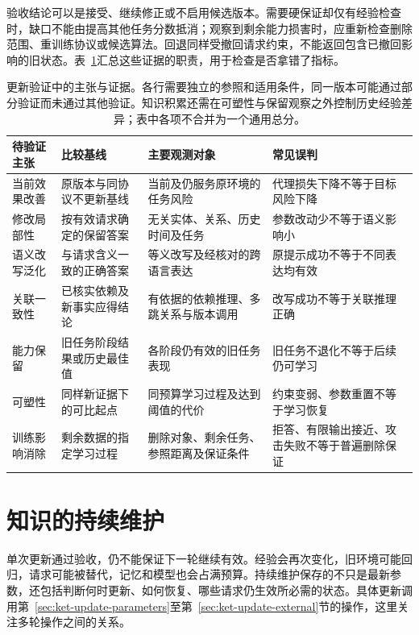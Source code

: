 验收结论可以是接受、继续修正或不启用候选版本。需要硬保证却仅有经验检查时，缺口不能由提高其他任务分数抵消；观察到剩余能力损害时，应重新检查删除范围、重训练协议或候选算法。回退同样受撤回请求约束，不能返回包含已撤回影响的旧状态。表~\ref{tab:ket-update-validation}汇总这些证据的职责，用于检查是否拿错了指标。

\begin{table}[htbp]
\small
\begin{tabularx}{\linewidth}{@{}p{19mm}XXX@{}}
\toprule
待验证主张 & 比较基线 & 主要观测对象 & 常见误判 \\
\midrule
当前效果改善 & 原版本与同协议不更新基线 & 当前及仍服务原环境的任务风险 & 代理损失下降不等于目标风险下降 \\
修改局部性 & 按有效请求确定的保留答案 & 无关实体、关系、历史时间及任务 & 参数改动少不等于语义影响小 \\
语义改写泛化 & 与请求含义一致的正确答案 & 等义改写及经核对的跨语言表达 & 原提示成功不等于不同表达均有效 \\
关联一致性 & 已核实依赖及新事实应得结论 & 有依据的依赖推理、多跳关系与版本调用 & 改写成功不等于关联推理正确 \\
能力保留 & 旧任务阶段结果或历史最佳值 & 各阶段仍有效的旧任务表现 & 旧任务不退化不等于后续仍可学习 \\
可塑性 & 同样新证据下的可比起点 & 同预算学习过程及达到阈值的代价 & 约束变弱、参数重置不等于学习恢复 \\
训练影响消除 & 剩余数据的指定学习过程 & 删除对象、剩余任务、参照距离及保证条件 & 拒答、有限输出接近、攻击失败不等于普遍删除保证 \\
\bottomrule
\end{tabularx}
\caption{更新验证中的主张与证据。各行需要独立的参照和适用条件，同一版本可能通过部分验证而未通过其他验证。知识积累还需在可塑性与保留观察之外控制历史经验差异；表中各项不合并为一个通用总分。}
\label{tab:ket-update-validation}
\end{table}

\section{知识的持续维护}
\label{sec:ket-update-maintenance}

单次更新通过验收，仍不能保证下一轮继续有效。经验会再次变化，旧环境可能回归，请求可能被替代，记忆和模型也会占满预算。持续维护保存的不只是最新参数，还包括判断何时更新、如何恢复、哪些请求仍生效所必需的状态。具体更新调用第~\ref{sec:ket-update-parameters}至第~\ref{sec:ket-update-external}节的操作，这里关注多轮操作之间的关系。

